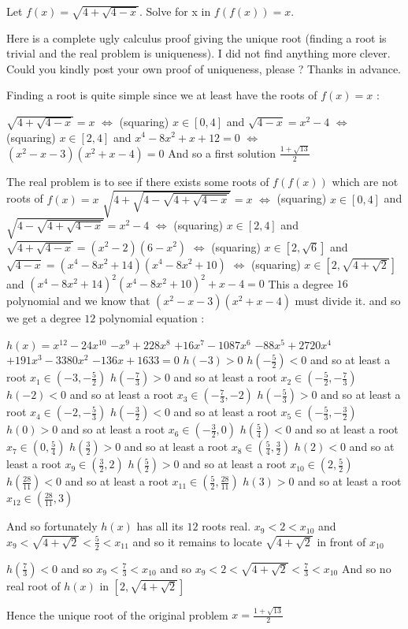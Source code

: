 \begin{solution}
	\begin{tcolorbox}Let $f(x)=\sqrt{4+\sqrt{4-x}}$. Solve for x in $f(f(x))=x$.\end{tcolorbox}
Here is a complete ugly calculus proof giving the unique root (finding a root is trivial and the real problem is uniqueness).
I did not find anything more clever.
Could you kindly post your own proof of uniqueness, please ?
Thanks in advance.


Finding a root is quite simple since we at least have the roots of $f(x)=x$ :

$\sqrt{4+\sqrt{4-x}}=x$
$\iff$ (squaring) $x\in[0,4]$ and $\sqrt{4-x}=x^2-4$
$\iff$ (squaring) $x\in[2,4]$ and $x^4-8x^2+x+12=0$ $\iff$ $(x^2-x-3)(x^2+x-4)=0$ 
And so a first solution $\frac{1+\sqrt{13}}2$

The real problem is to see if there exists some roots of $f(f(x))$ which are not roots of $f(x)=x$
$\sqrt{4+\sqrt{4-\sqrt{4+\sqrt{4-x}}}}=x$
$\iff$ (squaring) $x\in[0,4]$ and $\sqrt{4-\sqrt{4+\sqrt{4-x}}}=x^2-4$
$\iff$ (squaring) $x\in[2,4]$ and $\sqrt{4+\sqrt{4-x}}=(x^2-2)(6-x^2)$
$\iff$ (squaring) $x\in[2,\sqrt 6]$ and ${\sqrt{4-x}}=(x^4-8x^2+14)(x^4-8x^2+10)$
$\iff$ (squaring) $x\in[2,\sqrt {4+\sqrt 2}]$ and $(x^4-8x^2+14)^2(x^4-8x^2+10)^2+x-4=0$
This a degree $16$ polynomial and we know that $(x^2-x-3)(x^2+x-4)$ must divide it. and so we get a degree $12$ polynomial equation :

$h(x)=x^{12}-24x^{10}$ $-x^9+228x^8$ $+16x^7-1087x^6$ $-88x^5+2720x^4$ $+191x^3-3380x^2$ $-136x+1633=0$
$h(-3)>0$
$h(-\frac 52)<0$ and so at least a root $x_1\in(-3,-\frac 52)$
$h(-\frac 73)>0$ and so at least a root $x_2\in(-\frac 52,-\frac 73)$
$h(-2)<0$ and so at least a root $x_3\in(-\frac 73,-2)$
$h(-\frac 53)>0$ and so at least a root $x_4\in(-2,-\frac 53)$
$h(-\frac 32)<0$ and so at least a root $x_5\in(-\frac 53,-\frac 32)$
$h(0)>0$ and so at least a root $x_6\in(-\frac 32,0)$
$h(\frac 54)<0$ and so at least a root $x_7\in(0,\frac 54)$
$h(\frac 32)>0$ and so at least a root $x_8\in(\frac 54,\frac 32)$
$h(2)<0$ and so at least a root $x_9\in(\frac 32,2)$
$h(\frac 52)>0$ and so at least a root $x_{10}\in(2,\frac 52)$
$h(\frac {28}{11})<0$ and so at least a root $x_{11}\in(\frac 52,\frac {28}{11})$
$h(3)>0$ and so at least a root $x_{12}\in(\frac {28}{11},3)$

And so fortunately $h(x)$ has all its $12$ roots real.
$x_9<2<x_{10}$ and $x_9<\sqrt{4+\sqrt 2}<\frac 52<x_{11}$ and so it remains to locate $\sqrt{4+\sqrt 2}$ in front of $x_{10}$

$h(\frac 73)<0$ and so $x_9<\frac 73<x_{10}$ and so $x_9<2<\sqrt{4+\sqrt 2}<\frac 73<x_{10}$
And so no real root of $h(x)$ in $[2,\sqrt {4+\sqrt 2}]$

Hence the unique root of the original problem $\boxed{x=\frac{1+\sqrt{13}}2}$
\end{solution}



